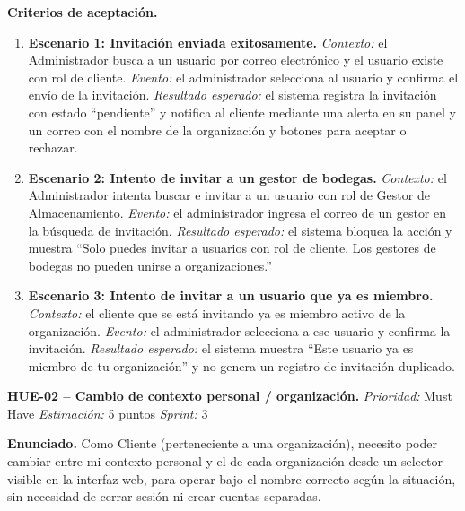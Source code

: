 \textbf{Criterios de aceptación.}
\begin{enumerate}
\item \textbf{Escenario 1: Invitación enviada exitosamente.} \textit{Contexto:} el Administrador busca a un usuario por correo electrónico y el usuario existe con rol de cliente. \textit{Evento:} el administrador selecciona al usuario y confirma el envío de la invitación. \textit{Resultado esperado:} el sistema registra la invitación con estado ``pendiente'' y notifica al cliente mediante una alerta en su panel y un correo con el nombre de la organización y botones para aceptar o rechazar.
\item \textbf{Escenario 2: Intento de invitar a un gestor de bodegas.} \textit{Contexto:} el Administrador intenta buscar e invitar a un usuario con rol de Gestor de Almacenamiento. \textit{Evento:} el administrador ingresa el correo de un gestor en la búsqueda de invitación. \textit{Resultado esperado:} el sistema bloquea la acción y muestra ``Solo puedes invitar a usuarios con rol de cliente. Los gestores de bodegas no pueden unirse a organizaciones.''
\item \textbf{Escenario 3: Intento de invitar a un usuario que ya es miembro.} \textit{Contexto:} el cliente que se está invitando ya es miembro activo de la organización. \textit{Evento:} el administrador selecciona a ese usuario y confirma la invitación. \textit{Resultado esperado:} el sistema muestra ``Este usuario ya es miembro de tu organización'' y no genera un registro de invitación duplicado.
\end{enumerate}

\textbf{HUE-02 -- Cambio de contexto personal / organización.} \label{req:HUE-02}
\textit{Prioridad:} Must Have \quad \textit{Estimación:} 5 puntos \quad \textit{Sprint:} 3

\textbf{Enunciado.} Como Cliente (perteneciente a una organización), necesito poder cambiar entre mi contexto personal y el de cada organización desde un selector visible en la interfaz web, para operar bajo el nombre correcto según la situación, sin necesidad de cerrar sesión ni crear cuentas separadas.

